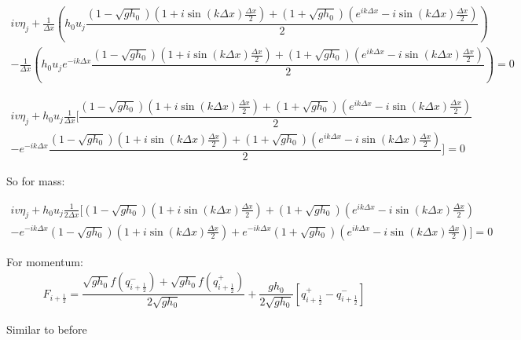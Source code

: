 \documentclass[12pt]{article}
\begin{document}
\begin{multline}
iv\eta_j +  \frac{1}{\Delta x}\left(h_0 u_j\dfrac{\left(1 - \sqrt{g h_0}\right)\left(1 + i\sin\left(k \Delta x\right) \frac{\Delta x}{2} \right) + \left(1 + \sqrt{g h_0}\right)\left(e^{ik\Delta x} -  i\sin\left(k \Delta x\right) \frac{\Delta x}{2} \right) }{2} \right)
  \\- \frac{1}{\Delta x}\left( h_0 u_{j}e^{-ik\Delta x}\dfrac{\left(1 - \sqrt{g h_0}\right)\left(1 + i\sin\left(k \Delta x\right) \frac{\Delta x}{2} \right) + \left(1 + \sqrt{g h_0}\right)\left(e^{ik\Delta x} -  i\sin\left(k \Delta x\right) \frac{\Delta x}{2} \right) }{2}\right)  = 0
\end{multline}

\begin{multline}
iv\eta_j + h_0 u_j  \frac{1}{\Delta x}[ \dfrac{\left(1 - \sqrt{g h_0}\right)\left(1 + i\sin\left(k \Delta x\right) \frac{\Delta x}{2} \right) + \left(1 + \sqrt{g h_0}\right)\left(e^{ik\Delta x} -  i\sin\left(k \Delta x\right) \frac{\Delta x}{2} \right) }{2} 
\\-  e^{-ik\Delta x}\dfrac{\left(1 - \sqrt{g h_0}\right)\left(1 + i\sin\left(k \Delta x\right) \frac{\Delta x}{2} \right) + \left(1 + \sqrt{g h_0}\right)\left(e^{ik\Delta x} -  i\sin\left(k \Delta x\right) \frac{\Delta x}{2} \right) }{2}] = 0
\end{multline}

So for mass:

\begin{multline}
iv\eta_j + h_0 u_j  \frac{1}{2\Delta x}[ \left(1 - \sqrt{g h_0}\right)\left(1 + i\sin\left(k \Delta x\right) \frac{\Delta x}{2} \right) + \left(1 + \sqrt{g h_0}\right)\left(e^{ik\Delta x} -  i\sin\left(k \Delta x\right) \frac{\Delta x}{2} \right)
\\-  e^{-ik\Delta x}\left(1 - \sqrt{g h_0}\right)\left(1 + i\sin\left(k \Delta x\right) \frac{\Delta x}{2} \right) +  e^{-ik\Delta x}\left(1 + \sqrt{g h_0}\right)\left(e^{ik\Delta x} -  i\sin\left(k \Delta x\right) \frac{\Delta x}{2} \right) ] = 0
\end{multline}

For momentum:
\begin{gather}
F_{i+\frac{1}{2}} = \dfrac{\sqrt{g h_0} f\left(q^-_{i+\frac{1}{2}}\right) + \sqrt{g h_0} f\left(q^+_{i+\frac{1}{2}}\right)}{2\sqrt{g h_0}}  + \dfrac{g h_0}{2\sqrt{g h_0}} \left [ q^+_{i+\frac{1}{2}} - q^-_{i+\frac{1}{2}} \right ]
\end{gather}

Similar to before
\end{document}
